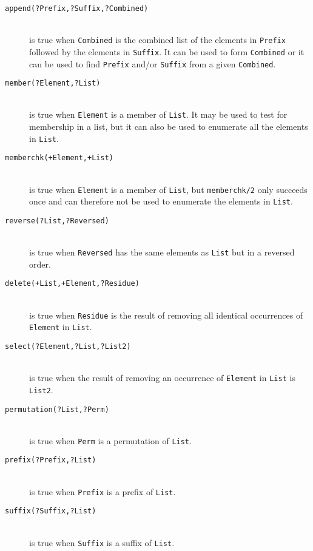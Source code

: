 \begin{description}

\item [{\tt append(?Prefix,?Suffix,?Combined)}]~\\
	is true when {\tt Combined} is the combined list of the elements in
	{\tt Prefix} followed by the elements in {\tt Suffix}.  It can
	be used to form {\tt Combined} or it can be used to find {\tt Prefix}
	and/or {\tt Suffix} from a given {\tt Combined}.

\item [{\tt member(?Element,?List)}]~\\
	is true when {\tt Element} is a member of {\tt List}.  It may
	be used to test for membership in a list, but it can also be used to
	enumerate all the elements in {\tt List}.

\item [{\tt memberchk(+Element,+List)}]~\\
	is true when {\tt Element} is a member of {\tt List}, but
	{\tt memberchk/2} only succeeds once and can therefore not be
	used to enumerate the elements in {\tt List}.

\item [{\tt reverse(?List,?Reversed)}]~\\
	is true when {\tt Reversed} has the same elements as
	{\tt List} but in a reversed order.

\item [{\tt delete(+List,+Element,?Residue)}]~\\
	is true when {\tt Residue} is the result of removing all
	identical occurrences of {\tt Element} in {\tt List}.

\item [{\tt select(?Element,?List,?List2)}]~\\
	is true when the result of removing an occurrence of
	{\tt Element} in {\tt List} is {\tt List2}.	

\item [{\tt permutation(?List,?Perm)}]~\\
	is true when {\tt Perm} is a permutation of {\tt List}.

\item [{\tt prefix(?Prefix,?List)}]~\\
	is true when {\tt Prefix} is a prefix of {\tt List}. 

\item [{\tt suffix(?Suffix,?List)}]~\\
	is true when {\tt Suffix} is a suffix of {\tt List}.


\end{description}
